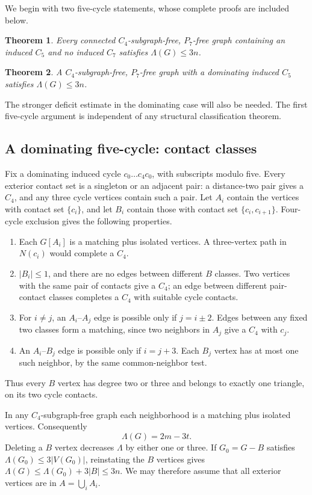 \documentclass[11pt,a4paper]{article}
\newtheorem{theorem}{Theorem}[section]
\theoremstyle{definition}\newtheorem{definition}[theorem]{Definition}
\theoremstyle{remark}\newtheorem{remark}[theorem]{Remark}
\begin{document}
We begin with two five-cycle statements, whose complete proofs are
included below.
\begin{theorem}\label{local15:thm:extension}
Every connected $C_4$-subgraph-free, $P_7$-free graph containing an induced
$C_5$ and no induced $C_7$ satisfies $\Lambda(G)\le3n$.
\end{theorem}
\begin{theorem}\label{local15:lem:dom}
A $C_4$-subgraph-free, $P_7$-free graph with a dominating induced $C_5$
satisfies $\Lambda(G)\le3n$.
\end{theorem}
The stronger deficit estimate in the dominating case will also be
needed. The first five-cycle argument is independent of any structural
classification theorem.
\subsection{A dominating five-cycle: contact classes}
Fix a dominating induced cycle $c_0\dots c_4c_0$, with subscripts modulo
five. Every exterior contact set is a singleton or an adjacent pair:
a distance-two pair gives a $C_4$, and any three cycle vertices contain
such a pair. Let $A_i$ contain the vertices with contact set $\{c_i\}$,
and let $B_i$ contain those with contact set $\{c_i,c_{i+1}\}$.
Four-cycle exclusion gives the following properties.
\begin{enumerate}[label=\textup{(\roman*)}]
\item Each $G[A_i]$ is a matching plus isolated vertices. A three-vertex
path in $N(c_i)$ would complete a $C_4$.
\item $|B_i|\le1$, and there are no edges between different $B$ classes.
Two vertices with the same pair of contacts give a $C_4$; an edge between
different pair-contact classes completes a $C_4$ with suitable cycle
contacts.
\item For $i\ne j$, an $A_i$--$A_j$ edge is possible only if $j=i\pm2$.
Edges between any fixed two classes form a matching, since two neighbors
in $A_j$ give a $C_4$ with $c_j$.
\item An $A_i$--$B_j$ edge is possible only if $i=j+3$. Each $B_j$
vertex has at most one such neighbor, by the same common-neighbor test.
\end{enumerate}
Thus every $B$ vertex has degree two or three and belongs to exactly one
triangle, on its two cycle contacts.

In any $C_4$-subgraph-free graph each neighborhood is a matching plus
isolated vertices. Consequently
\begin{equation}\label{local15:eq:L}
 \Lambda(G)=2m-3t.
\end{equation}
Deleting a $B$ vertex decreases $\Lambda$ by either one or three. If
$G_0=G-B$ satisfies $\Lambda(G_0)\le3|V(G_0)|$, reinstating the $B$ vertices
gives $\Lambda(G)\le \Lambda(G_0)+3|B|\le3n$. We may therefore assume that all
exterior vertices are in $A=\bigcup_iA_i$.
\end{document}
